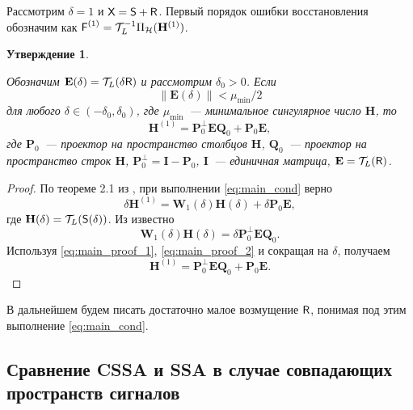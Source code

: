 \documentclass[specialist,
               substylefile = spbu.rtx,
               subf,href,colorlinks=true, 12pt]{disser}
\newtheorem{statement}{Утверждение}
\begin{document}
Рассмотрим $\delta = 1$ и $\textsf{X} = \textsf{S} + \textsf{R}$. Первый порядок ошибки восстановления обозначим как $\textsf{F}^{(1)} = \mathcal{T}_L^{-1} \Pi_{\mathcal{H}}(\mathbf{H}^{(1)})$.

\begin{statement} \label{st:main}
	
	Обозначим $\mathbf{E}(\delta) = \mathcal{T}_L(\delta \textsf{R})$ и рассмотрим $\delta_0 > 0$. Если
	\begin{equation} \label{eq:main_cond}
		\|\mathbf{E}(\delta)\| < \mu_{\min} / 2
	\end{equation}
	для любого $\delta \in (-\delta_0, \delta_0)$, где $\mu_{\min}$~--- минимальное сингулярное число $\mathbf{H}$, то
\begin{equation} \label{eq:main}
	\mathbf{H}^{(1)} = \mathbf{P}^{\perp}_0 \mathbf{E} \mathbf{Q}_0 + \mathbf{P}_0 \mathbf{E},
\end{equation}
где $\mathbf{P}_0$~--- проектор на пространство столбцов $\mathbf{H}$, $\mathbf{Q}_0$~--- проектор на пространство строк $\mathbf{H}$, $\mathbf{P}^{\perp}_0 = \mathbf{I} - \mathbf{P}_0$, $\mathbf{I}$~--- единичная матрица, $\mathbf{E} = \mathcal{T}_L(\textsf{R})$.
\end{statement}
\begin{proof}
	
По теореме 2.1 из \cite{Nekrutkin}, при выполнении \eqref{eq:main_cond} верно
\begin{equation} \label{eq:main_proof_1}
\delta\mathbf{H}^{(1)} = \mathbf{W}_1(\delta) \mathbf{H}(\delta) + \delta \mathbf{P}_0 \mathbf{E},
\end{equation}
где $\mathbf{H}(\delta) = \mathcal{T}_L(\textsf{S}(\delta))$.
Из \cite[стр.12]{Konstantinov} известно
\begin{equation} \label{eq:main_proof_2}
	\mathbf{W}_1(\delta) \mathbf{H}(\delta) = \delta \mathbf{P}^{\perp}_0 \mathbf{E} \mathbf{Q}_0.
\end{equation}
Используя \eqref{eq:main_proof_1}, \eqref{eq:main_proof_2} и сокращая на $\delta$, получаем
\begin{equation*}
	\mathbf{H}^{(1)} = \mathbf{P}^{\perp}_0 \mathbf{E} \mathbf{Q}_0 + \mathbf{P}_0 \mathbf{E}.
\end{equation*}
\end{proof}

В дальнейшем будем писать достаточно малое возмущение $\textsf{R}$, понимая под этим выполнение \eqref{eq:main_cond}.

\subsection{Сравнение CSSA и SSA в случае совпадающих пространств сигналов}
\end{document}
